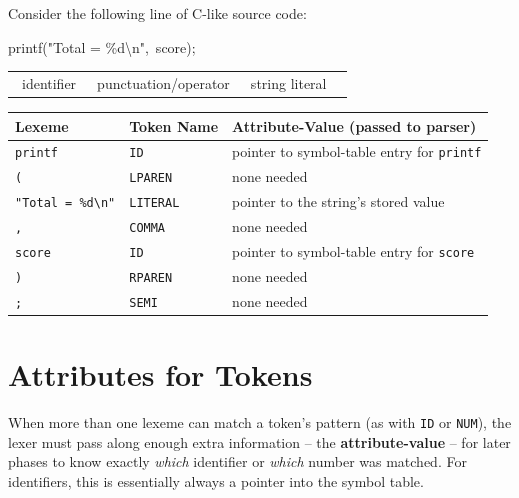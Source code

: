 \documentclass[full-course-notes.tex]{subfiles}
\begin{document}
Consider the following line of C-like source code:

\begin{center}
\ttfamily\large
\colorbox{dbGreenBg}{printf}\colorbox{examRedBg}{(}\colorbox{enrichGoldBg}{"Total = \%d\textbackslash n"}\colorbox{examRedBg}{,}\ \colorbox{dbGreenBg}{score}\colorbox{examRedBg}{)}\colorbox{examRedBg}{;}
\end{center}
\begin{center}
\small\begin{tabular}{@{}p{2.6cm}p{2.6cm}p{2.6cm}p{2.6cm}@{}}
\colorbox{dbGreenBg}{\phantom{x}}\ identifier &
\colorbox{examRedBg}{\phantom{x}}\ punctuation/operator &
\colorbox{enrichGoldBg}{\phantom{x}}\ string literal &
\end{tabular}
\end{center}

\begin{center}
\renewcommand{\arraystretch}{1.25}
\begin{tabularx}{\textwidth}{@{}l l X@{}}
\toprule
\textbf{Lexeme} & \textbf{Token Name} & \textbf{Attribute-Value (passed to parser)} \\
\midrule
\texttt{printf} & \texttt{ID} & pointer to symbol-table entry for \texttt{printf} \\
\texttt{(} & \texttt{LPAREN} & none needed \\
\texttt{"Total = \%d\textbackslash n"} & \texttt{LITERAL} & pointer to the string's stored value \\
\texttt{,} & \texttt{COMMA} & none needed \\
\texttt{score} & \texttt{ID} & pointer to symbol-table entry for \texttt{score} \\
\texttt{)} & \texttt{RPAREN} & none needed \\
\texttt{;} & \texttt{SEMI} & none needed \\
\bottomrule
\end{tabularx}
\end{center}

\section{Attributes for Tokens}
\label{sec:l3-attributes}

\dbtag When more than one lexeme can match a token's pattern (as with \texttt{ID} or
\texttt{NUM}), the lexer must pass along enough extra information -- the \textbf{attribute-value}
-- for later phases to know exactly \emph{which} identifier or \emph{which} number was matched.
For identifiers, this is essentially always a pointer into the symbol table.
\end{document}
